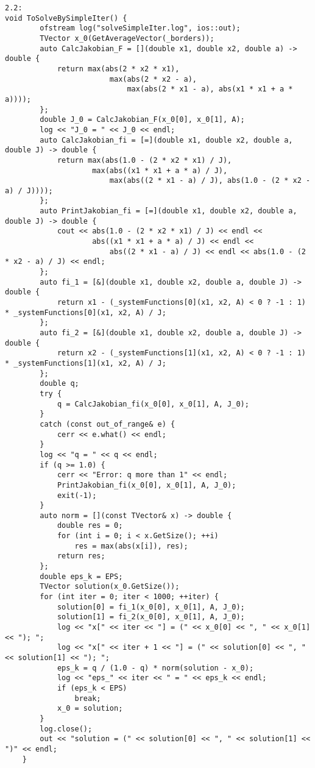 \begin{lstlisting}
2.2:
void ToSolveBySimpleIter() {
        ofstream log("solveSimpleIter.log", ios::out);
        TVector x_0(GetAverageVector(_borders)); 
        auto CalcJakobian_F = [](double x1, double x2, double a) -> double { 
            return max(abs(2 * x2 * x1), 
                        max(abs(2 * x2 - a), 
                            max(abs(2 * x1 - a), abs(x1 * x1 + a * a)))); 
        };
        double J_0 = CalcJakobian_F(x_0[0], x_0[1], A);
        log << "J_0 = " << J_0 << endl;
        auto CalcJakobian_fi = [=](double x1, double x2, double a, double J) -> double {
            return max(abs(1.0 - (2 * x2 * x1) / J), 
                    max(abs((x1 * x1 + a * a) / J), 
                        max(abs((2 * x1 - a) / J), abs(1.0 - (2 * x2 - a) / J))));
        };
        auto PrintJakobian_fi = [=](double x1, double x2, double a, double J) -> double {
            cout << abs(1.0 - (2 * x2 * x1) / J) << endl <<
                    abs((x1 * x1 + a * a) / J) << endl << 
                        abs((2 * x1 - a) / J) << endl << abs(1.0 - (2 * x2 - a) / J) << endl;
        };
        auto fi_1 = [&](double x1, double x2, double a, double J) -> double {
            return x1 - (_systemFunctions[0](x1, x2, A) < 0 ? -1 : 1) * _systemFunctions[0](x1, x2, A) / J; 
        };
        auto fi_2 = [&](double x1, double x2, double a, double J) -> double {
            return x2 - (_systemFunctions[1](x1, x2, A) < 0 ? -1 : 1) * _systemFunctions[1](x1, x2, A) / J; 
        };
        double q;
        try {
            q = CalcJakobian_fi(x_0[0], x_0[1], A, J_0);
        }
        catch (const out_of_range& e) {
            cerr << e.what() << endl;
        }
        log << "q = " << q << endl;       
		if (q >= 1.0) {
			cerr << "Error: q more than 1" << endl;
			PrintJakobian_fi(x_0[0], x_0[1], A, J_0);
			exit(-1);
		}
        auto norm = [](const TVector& x) -> double { 
            double res = 0;
            for (int i = 0; i < x.GetSize(); ++i)
                res = max(abs(x[i]), res);
            return res; 
        };
        double eps_k = EPS;    
        TVector solution(x_0.GetSize());
        for (int iter = 0; iter < 1000; ++iter) {
            solution[0] = fi_1(x_0[0], x_0[1], A, J_0);
            solution[1] = fi_2(x_0[0], x_0[1], A, J_0);
            log << "x[" << iter << "] = (" << x_0[0] << ", " << x_0[1] << "); ";
            log << "x[" << iter + 1 << "] = (" << solution[0] << ", " << solution[1] << "); ";
            eps_k = q / (1.0 - q) * norm(solution - x_0);
            log << "eps_" << iter << " = " << eps_k << endl;
            if (eps_k < EPS)
                break;
            x_0 = solution;
        }
        log.close();
        out << "solution = (" << solution[0] << ", " << solution[1] << ")" << endl;
    }


\end{lstlisting}
